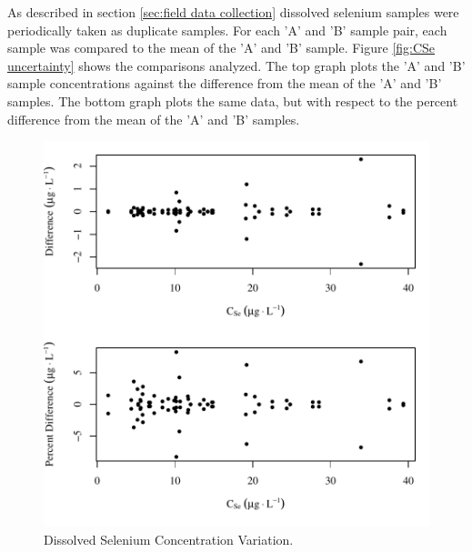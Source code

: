 \begin{linenumbers}
As described in section \ref{sec:field data collection} dissolved selenium samples were periodically taken as duplicate samples.  For each 'A' and 'B' sample pair, each sample was compared to the mean of the 'A' and 'B' sample.  Figure \ref{fig:CSe uncertainty} shows the comparisons analyzed.  The top graph plots the 'A' and 'B' sample concentrations against the difference from the mean of the 'A' and 'B' samples.  The bottom graph plots the same data, but with respect to the percent difference from the mean of the 'A' and 'B' samples.
\begin{figure}
\begin{center}
	\includegraphics[width=6in]{"Figures/Results_USR/CSe Error Scatter"}
	\caption[Dissolved Selenium Concentration Variation]{Dissolved Selenium Concentration Variation.}
\end{center}
\end{figure}


\end{linenumbers}
